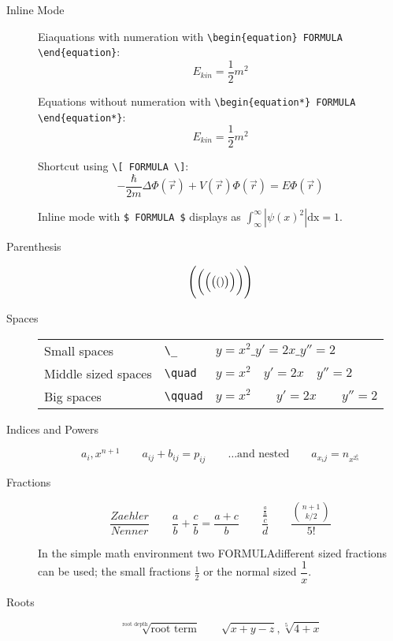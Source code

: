 \documentclass[10pt,a4paper]{scrartcl}
\begin{document}
\begin{description}

\item[Inline Mode]
Eiaquations with numeration with \verb$\begin{equation} FORMULA \end{equation}$:
\begin{equation} 
E_{kin} = \frac 1 2 m^2
\end{equation}

Equations without numeration with \verb$\begin{equation*} FORMULA \end{equation*}$:
\begin{equation*} 
E_{kin} = \frac 1 2 m^2
\end{equation*}

Shortcut using \verb$\[ FORMULA \]$:
\[ -\frac{\hbar}{2m}\Delta\Phi(\vec r) + V(\vec r)\Phi(\vec r) = E\Phi(\vec r) \]

Inline mode with \verb|$ FORMULA $| displays as 
$\int_\infty^\infty |\psi(x)^2|\mathrm{dx} = 1$.

\item[Parenthesis]
\[ \Biggl( \biggl( \Bigl( \bigl( ( ) \bigr) \Bigr) \biggr) \Biggr) \]

\item[Spaces]
\begin{tabular}[t]{lll}
Small spaces        & \verb$\_$     & $ y=x^{2} \_ y'=2x \_  y''=2 $ \\
Middle sized spaces & \verb$\quad$  & $ y=x^{2} \quad y'=2x \quad  y''=2 $ \\
Big spaces          & \verb$\qquad$ & $ y=x^{2} \qquad y'=2x \qquad  y''=2 $
\end{tabular}

\item[Indices and Powers]
\[ a_i, x^{n+1} \qquad a_{ij} + b_{ij} = p_{ij} \qquad 
    \text{\ldots and nested} \qquad
    a_{x_ij} = n_{x^{2^b_n}} \]

\item[Fractions]
\[  \frac{Zaehler}{Nenner} \qquad 
    \frac{a}{b} + \frac{c}{b} = \frac{ a+c}{b} \qquad
    \frac{\frac{\frac{a}{b}}{c}}{d} \qquad
    \frac {{n+1 \choose k/2}} {5!} \]

\noindent In the simple math environment two FORMULAdifferent sized fractions can be 
used; the small fractions $\frac{1}{2}$ or the normal sized $\dfrac{1}{x}$.

\item[Roots]    
\[  \sqrt[\text{root depth}]{\text{root term}} \qquad
    \sqrt{x+y-z}, \sqrt[5]{4+x} \]
                

\end{description}
\end{document}
